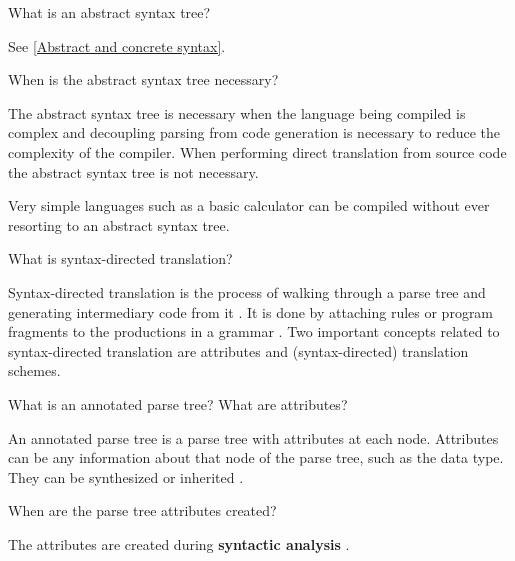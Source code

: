 \begin{Exercise}[difficulty=1]
What is an abstract syntax tree?
\end{Exercise}
\begin{Answer}
See \ref{Abstract and concrete syntax}.
\end{Answer}

\begin{Exercise}
When is the abstract syntax tree necessary?
\end{Exercise}
\begin{Answer}
The abstract syntax tree is necessary when the language being compiled is complex and decoupling parsing from code generation is necessary to reduce the complexity of the compiler.
When performing direct translation from source code the abstract syntax tree is not necessary.

Very simple languages such as a basic calculator can be compiled without ever resorting to an abstract syntax tree.
\end{Answer}

\begin{Exercise}
What is syntax-directed translation?
\end{Exercise}
\begin{Answer}
Syntax-directed translation is the process of walking through a parse tree and generating intermediary code from it \cite[p.~12]{compilers-aho-2007}.
It is done by attaching rules or program fragments to the productions in a grammar \cite[p.~52]{compilers-aho-2007}.
Two important concepts related to syntax-directed translation are attributes and (syntax-directed) translation schemes.
\end{Answer}

\begin{Exercise}
What is an annotated parse tree? What are attributes?
\end{Exercise}
\begin{Answer}
An annotated parse tree is a parse tree with attributes at each node.
Attributes can be any information about that node of the parse tree, such as the data type.
They can be synthesized or inherited \cite[p.~55]{compilers-aho-2007}.
\end{Answer}

\begin{Exercise}
When are the parse tree attributes created?
\end{Exercise}
\begin{Answer}
The attributes are created during \textbf{syntactic analysis} \cite[p.~54]{compilers-aho-2007}.
\end{Answer}

